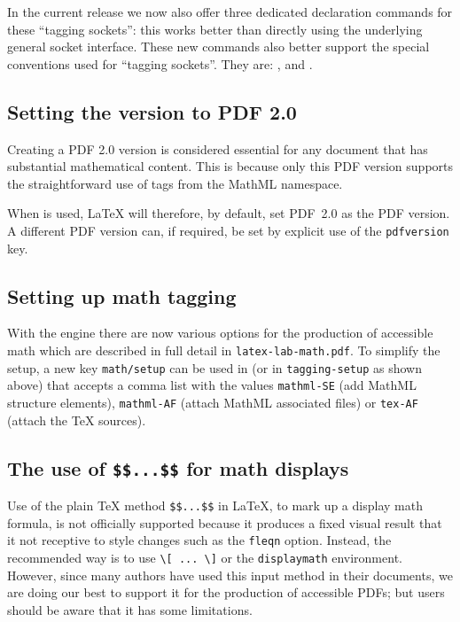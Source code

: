 \documentclass{ltnews}
\providecommand\env[1]{\texttt{#1}}
\providecommand\LuaTeX{\hologo{LuaTeX}}
\providecommand\env[1]{\texttt{#1}}
\begin{document}
In the current release we now also offer three dedicated declaration
commands for these \enquote{tagging sockets}: this works better than
directly using the underlying general socket interface.  These new
commands also better support the special conventions used for
\enquote{tagging sockets}. They are: ,
 and .


\subsection{Setting the version to PDF 2.0}

Creating a PDF 2.0 version is considered essential for any document
that has substantial mathematical content.  This is because only this
PDF version supports the straightforward use of tags from the MathML
namespace.

When  is used, \LaTeX{} will therefore, by
default, set PDF~2.0 as the PDF version.  A different PDF version can,
if required, be set by explicit use of the \texttt{pdfversion} key.




\subsection{Setting up math tagging}

With the \LuaTeX{} engine there are now various options for the
production of accessible math which are described in full detail in
\texttt{latex-lab-math.pdf}. To simplify the setup, a new key
\texttt{math/setup} can be used in  (or in
\texttt{tagging-setup} as shown above) that accepts a comma list with
the values \texttt{mathml-SE} (add MathML structure elements),
\texttt{mathml-AF} (attach MathML associated files) or \texttt{tex-AF}
(attach the \TeX{} sources).


\subsection{The use of \texttt{\$\$...\$\$} for math displays}

Use of the plain \TeX{} method \verb=$$...$$= in \LaTeX{}, to mark up
a display math formula, is not officially supported because it
produces a fixed visual result that it not receptive to style changes
such as the \texttt{fleqn} option. Instead, the recommended way is to
use \verb=\[ ... \]= or the \env{displaymath} environment. However,
since many authors have used this input method in their documents, we
are doing our best to support it for the production of accessible
PDFs; but users should be aware that it has some limitations.
\end{document}
